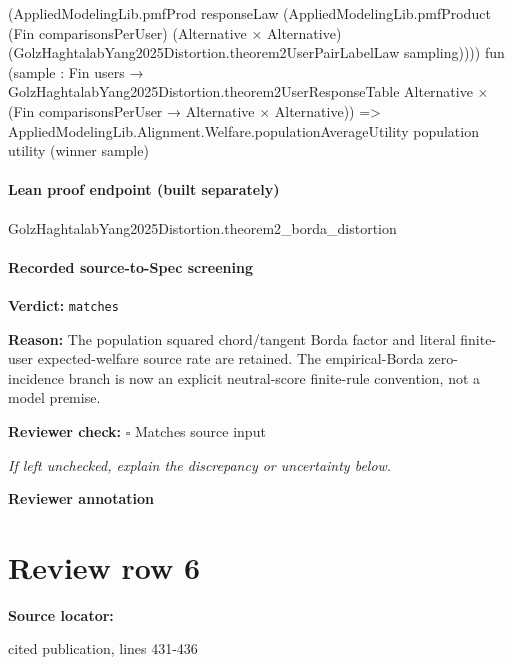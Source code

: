 \documentclass[10pt]{article}
\newcommand{\reviewerbox}{%
  \par\noindent\fbox{\parbox{0.96\linewidth}{\rule{0pt}{0.38in}}}\par
}
\newcommand{\reviewmatch}[1]{%
  \par\noindent\textbf{Reviewer check:} $\square$\; #1\par
  \noindent\emph{If left unchecked, explain the discrepancy or uncertainty below.}\par
}
\begin{document}
\begin{ReviewVerbatim}
                                            (AppliedModelingLib.pmfProd responseLaw
                                              (AppliedModelingLib.pmfProduct (Fin comparisonsPerUser)
                                                (Alternative × Alternative)
                                                (GolzHaghtalabYang2025Distortion.theorem2UserPairLabelLaw sampling))))
                                          fun
                                            (sample :
                                              Fin users →
                                                GolzHaghtalabYang2025Distortion.theorem2UserResponseTable Alternative ×
                                                  (Fin comparisonsPerUser → Alternative × Alternative)) =>
                                          AppliedModelingLib.Alignment.Welfare.populationAverageUtility population
                                            utility (winner sample)
\end{ReviewVerbatim}

\paragraph{Lean proof endpoint (built separately)}\begin{ReviewVerbatim}
GolzHaghtalabYang2025Distortion.theorem2_borda_distortion
\end{ReviewVerbatim}

\paragraph{Recorded source-to-Spec screening}
\textbf{Verdict:} \texttt{matches}
\\
{\raggedright
\textbf{Reason:} The population squared chord/\allowbreak{}tangent Borda factor and literal finite-\allowbreak{}user expected-\allowbreak{}welfare source rate are retained.\allowbreak{} The empirical-\allowbreak{}Borda zero-\allowbreak{}incidence branch is now an explicit neutral-\allowbreak{}score finite-\allowbreak{}rule convention, not a model premise.\allowbreak{}
\par}
\reviewmatch{Matches source input}
\noindent\textbf{Reviewer annotation}\par
\reviewerbox
\clearpage
\hypertarget{source-claim-c933c69486621c74}{}
\section*{Review row 6}
\textbf{Source locator:} {\footnotesize\raggedright cited publication, lines 431-\allowbreak{}436\par}
\end{document}

